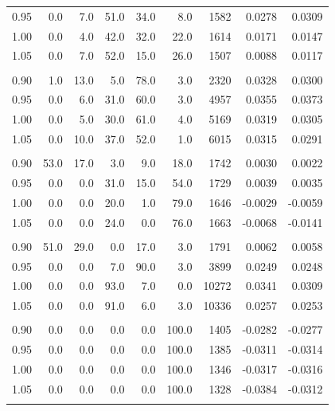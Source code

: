 \begin{table}[t]
\begin{tabular}{r r r r r r r r r}
0.95 & 0.0 & 7.0 & 51.0 & 34.0 & 8.0 & 1582 & 0.0278 & 0.0309 \\
1.00 & 0.0 & 4.0 & 42.0 & 32.0 & 22.0 & 1614 & 0.0171 & 0.0147 \\
1.05 & 0.0 & 7.0 & 52.0 & 15.0 & 26.0 & 1507 & 0.0088 & 0.0117 \\
\addlinespace[0.35em]
\multicolumn{9}{l}{$N=16$, $\mathrm{ppn}=4$, $t=10\,\mathrm{s}$} \\
\midrule
0.90 & 1.0 & 13.0 & 5.0 & 78.0 & 3.0 & 2320 & 0.0328 & 0.0300 \\
0.95 & 0.0 & 6.0 & 31.0 & 60.0 & 3.0 & 4957 & 0.0355 & 0.0373 \\
1.00 & 0.0 & 5.0 & 30.0 & 61.0 & 4.0 & 5169 & 0.0319 & 0.0305 \\
1.05 & 0.0 & 10.0 & 37.0 & 52.0 & 1.0 & 6015 & 0.0315 & 0.0291 \\
\addlinespace[0.35em]
\multicolumn{9}{l}{$N=16$, $\mathrm{ppn}=8$, $t=1\,\mathrm{s}$} \\
\midrule
0.90 & 53.0 & 17.0 & 3.0 & 9.0 & 18.0 & 1742 & 0.0030 & 0.0022 \\
0.95 & 0.0 & 0.0 & 31.0 & 15.0 & 54.0 & 1729 & 0.0039 & 0.0035 \\
1.00 & 0.0 & 0.0 & 20.0 & 1.0 & 79.0 & 1646 & -0.0029 & -0.0059 \\
1.05 & 0.0 & 0.0 & 24.0 & 0.0 & 76.0 & 1663 & -0.0068 & -0.0141 \\
\addlinespace[0.35em]
\multicolumn{9}{l}{$N=16$, $\mathrm{ppn}=8$, $t=10\,\mathrm{s}$} \\
\midrule
0.90 & 51.0 & 29.0 & 0.0 & 17.0 & 3.0 & 1791 & 0.0062 & 0.0058 \\
0.95 & 0.0 & 0.0 & 7.0 & 90.0 & 3.0 & 3899 & 0.0249 & 0.0248 \\
1.00 & 0.0 & 0.0 & 93.0 & 7.0 & 0.0 & 10272 & 0.0341 & 0.0309 \\
1.05 & 0.0 & 0.0 & 91.0 & 6.0 & 3.0 & 10336 & 0.0257 & 0.0253 \\
\addlinespace[0.35em]
\multicolumn{9}{l}{$N=32$, $\mathrm{ppn}=4$, $t=1\,\mathrm{s}$} \\
\midrule
0.90 & 0.0 & 0.0 & 0.0 & 0.0 & 100.0 & 1405 & -0.0282 & -0.0277 \\
0.95 & 0.0 & 0.0 & 0.0 & 0.0 & 100.0 & 1385 & -0.0311 & -0.0314 \\
1.00 & 0.0 & 0.0 & 0.0 & 0.0 & 100.0 & 1346 & -0.0317 & -0.0316 \\
1.05 & 0.0 & 0.0 & 0.0 & 0.0 & 100.0 & 1328 & -0.0384 & -0.0312 \\
\addlinespace[0.35em]
\multicolumn{9}{l}{$N=32$, $\mathrm{ppn}=4$, $t=10\,\mathrm{s}$} \\

\end{tabular}
\end{table}
